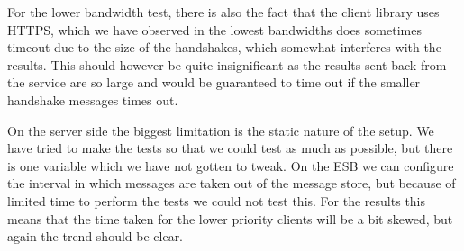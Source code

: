 	For the lower bandwidth test, there is also the fact that the client library uses HTTPS, which we have observed in the lowest bandwidths does sometimes timeout due to the size of the handshakes, which somewhat interferes with the results. This should however be quite insignificant as the results sent back from the service are so large and would be guaranteed to time out if the smaller handshake messages times out.
	
	On the server side the biggest limitation is the static nature of the setup. We have tried to make the tests so that we could test as much as possible, but there is one variable which we have not gotten to tweak. On the ESB we can configure the interval in which messages are taken out of the message store, but because of limited time to perform the tests we could not test this. For the results this means that the time taken for the lower priority clients will be a bit skewed, but again the trend should be clear.
